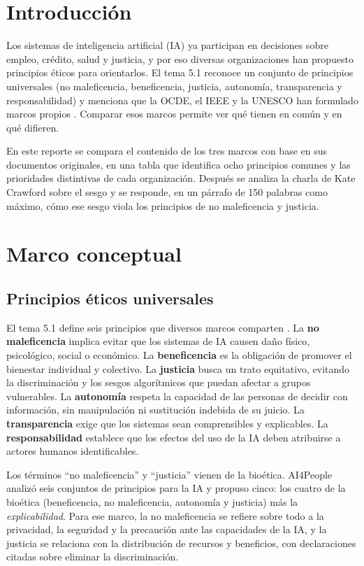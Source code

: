 \documentclass[11pt,letterpaper]{article}
\begin{document}
\portada
\indicegeneral

\section{Introducción}

Los sistemas de inteligencia artificial (IA) ya participan en decisiones sobre empleo, crédito, salud y justicia, y por eso diversas organizaciones han propuesto principios éticos para orientarlos. El tema 5.1 reconoce un conjunto de principios universales (no maleficencia, beneficencia, justicia, autonomía, transparencia y responsabilidad) y menciona que la OCDE, el IEEE y la UNESCO han formulado marcos propios \parencite{iae_u5_t51}. Comparar esos marcos permite ver qué tienen en común y en qué difieren.

En este reporte se compara el contenido de los tres marcos con base en sus documentos originales, en una tabla que identifica ocho principios comunes y las prioridades distintivas de cada organización. Después se analiza la charla de Kate Crawford sobre el sesgo y se responde, en un párrafo de 150 palabras como máximo, cómo ese sesgo viola los principios de no maleficencia y justicia.

\section{Marco conceptual}

\subsection{Principios éticos universales}

El tema 5.1 define seis principios que diversos marcos comparten \parencite{iae_u5_t51}. La \textbf{no maleficencia} implica evitar que los sistemas de IA causen daño físico, psicológico, social o económico. La \textbf{beneficencia} es la obligación de promover el bienestar individual y colectivo. La \textbf{justicia} busca un trato equitativo, evitando la discriminación y los sesgos algorítmicos que puedan afectar a grupos vulnerables. La \textbf{autonomía} respeta la capacidad de las personas de decidir con información, sin manipulación ni sustitución indebida de su juicio. La \textbf{transparencia} exige que los sistemas sean comprensibles y explicables. La \textbf{responsabilidad} establece que los efectos del uso de la IA deben atribuirse a actores humanos identificables.

Los términos ``no maleficencia'' y ``justicia'' vienen de la bioética. AI4People \parencite{floridi2018} analizó seis conjuntos de principios para la IA y propuso cinco: los cuatro de la bioética (beneficencia, no maleficencia, autonomía y justicia) más la \textit{explicabilidad}. Para ese marco, la no maleficencia se refiere sobre todo a la privacidad, la seguridad y la precaución ante las capacidades de la IA, y la justicia se relaciona con la distribución de recursos y beneficios, con declaraciones citadas sobre eliminar la discriminación.
\end{document}
